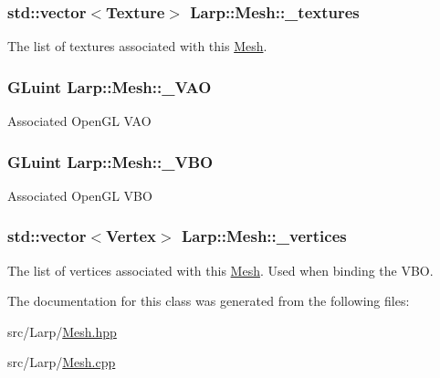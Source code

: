 \subsubsection[{\texorpdfstring{\+\_\+textures}{_textures}}]{\setlength{\rightskip}{0pt plus 5cm}std\+::vector$<${\bf Texture}$>$ Larp\+::\+Mesh\+::\+\_\+textures}\hypertarget{classLarp_1_1Mesh_a54c9edf45e99fb0261a39bfc3e8ff091}{}\label{classLarp_1_1Mesh_a54c9edf45e99fb0261a39bfc3e8ff091}
The list of textures associated with this \hyperlink{classLarp_1_1Mesh}{Mesh}. 
\subsubsection[{\texorpdfstring{\+\_\+\+V\+AO}{_VAO}}]{\setlength{\rightskip}{0pt plus 5cm}G\+Luint Larp\+::\+Mesh\+::\+\_\+\+V\+AO\hspace{0.3cm}{\ttfamily [private]}}\hypertarget{classLarp_1_1Mesh_acba7ec21576ff64c769df9d374ed1cc5}{}\label{classLarp_1_1Mesh_acba7ec21576ff64c769df9d374ed1cc5}
Associated Open\+GL V\+AO 
\subsubsection[{\texorpdfstring{\+\_\+\+V\+BO}{_VBO}}]{\setlength{\rightskip}{0pt plus 5cm}G\+Luint Larp\+::\+Mesh\+::\+\_\+\+V\+BO\hspace{0.3cm}{\ttfamily [private]}}\hypertarget{classLarp_1_1Mesh_a72ad2a0ac19c617fc9abc4f48fd99350}{}\label{classLarp_1_1Mesh_a72ad2a0ac19c617fc9abc4f48fd99350}
Associated Open\+GL V\+BO 
\subsubsection[{\texorpdfstring{\+\_\+vertices}{_vertices}}]{\setlength{\rightskip}{0pt plus 5cm}std\+::vector$<${\bf Vertex}$>$ Larp\+::\+Mesh\+::\+\_\+vertices}\hypertarget{classLarp_1_1Mesh_af77086ebadfb8b0f4fb3c2e5f39d6a43}{}\label{classLarp_1_1Mesh_af77086ebadfb8b0f4fb3c2e5f39d6a43}
The list of vertices associated with this \hyperlink{classLarp_1_1Mesh}{Mesh}. Used when binding the V\+BO. 

The documentation for this class was generated from the following files\+:\begin{DoxyCompactItemize}
\item 
src/\+Larp/\hyperlink{Mesh_8hpp}{Mesh.\+hpp}\item 
src/\+Larp/\hyperlink{Mesh_8cpp}{Mesh.\+cpp}\end{DoxyCompactItemize}
